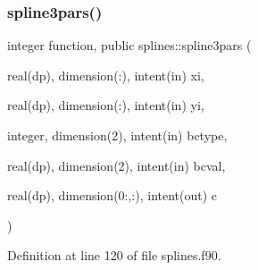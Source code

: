 \mbox{\label{namespacesplines_a05f420f0b3b0106002e125873e32f9f8}} 
\subsubsection{\texorpdfstring{spline3pars()}{spline3pars()}}
{\footnotesize\ttfamily integer function, public splines\+::spline3pars (\begin{DoxyParamCaption}\item[{real(dp), dimension(\+:), intent(in)}]{xi,  }\item[{real(dp), dimension(\+:), intent(in)}]{yi,  }\item[{integer, dimension(2), intent(in)}]{bctype,  }\item[{real(dp), dimension(2), intent(in)}]{bcval,  }\item[{real(dp), dimension(0\+:,\+:), intent(out)}]{c }\end{DoxyParamCaption})}



Definition at line 120 of file splines.\+f90.

